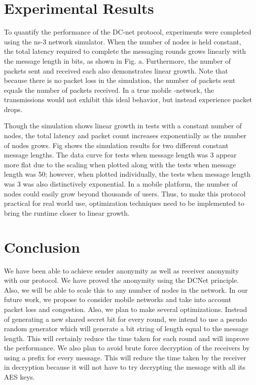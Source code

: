 \documentclass{acm_proc_article-sp}
\begin{document}
\section{Experimental Results}
\vspace{1 mm}

To quantify the performance of the DC-net protocol, experiments were completed using the ns-3 network simulator. When the number of nodes is held constant, the total latency required to complete the messaging rounds grows linearly with the message length in bits, as shown in Fig. a. Furthermore, the number of packets sent and received each also demonstrates linear growth. Note that because there is no packet loss in the simulation, the number of packets sent equals the number of packets received. In a true mobile -network, the transmissions would not exhibit this ideal behavior, but instead experience packet drops.


Though the simulation shows linear growth in tests with a constant number of nodes, the total latency and packet count increases exponentially as the number of nodes grows. Fig shows the simulation results for two different constant message lengths. The data curve for tests when message length was 3 appear more flat due to the scaling when plotted along with the tests when message length was 50; however, when plotted individually, the tests when message length was 3 was also distinctively exponential. In a mobile platform, the number of nodes could easily grow beyond thousands of users. Thus, to make this protocol practical for real world use, optimization techniques need to be implemented to bring the runtime closer to linear growth.

\section{Conclusion}
\vspace{1 mm}

We have been able to achieve sender anonymity as well as receiver anonymity with our protocol. We have proved the anonymity using the DCNet principle. Also, we will be able to scale this to any number of nodes in the network. In our future work, we propose to consider mobile networks and take into account packet loss and congestion. Also, we plan to make several optimizations.  Instead of generating a new shared secret bit for every round, we intend to use a pseudo random generator which will generate a bit string of length equal to the message length. This will certainly reduce the time taken for each round and will improve the performance. We also plan to avoid brute force decryption of the receivers by using a prefix for every message. This will reduce the time taken by the receiver in decryption because it will not have to try decrypting the message with all its AES keys.
\end{document}

